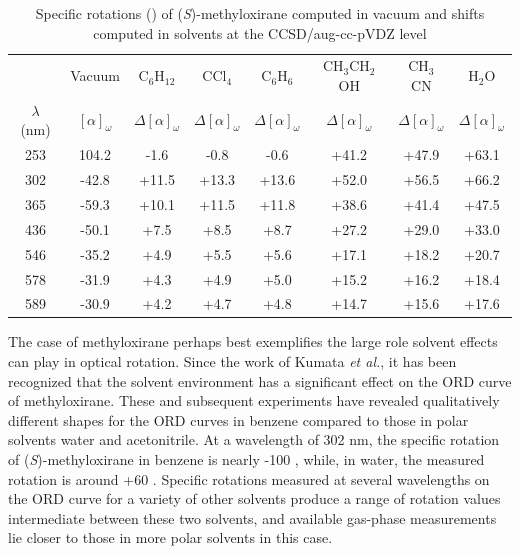 \begin{table}[h]
\caption{Specific rotations (\rotunits) of (\emph{S})-methyloxirane computed
in vacuum and shifts computed in solvents at the CCSD/aug-cc-pVDZ level
}
\begin{tabular*}{\linewidth}{@{\extracolsep{\fill}}cccccccc@{}}
  \hline \hline
&Vacuum &C$_6$H$_{12}$ &CCl$_4$&C$_6$H$_6$ &CH$_3$CH$_2$OH &CH$_3$CN  &H$_2$O \\
$\lambda$ (nm)
       &$[\alpha]_\omega$ &$\Delta [\alpha]_\omega$  &$\Delta [\alpha]_\omega$ 
&$\Delta [\alpha]_\omega$ &$\Delta [\alpha]_\omega$
&$\Delta [\alpha]_\omega$ &$\Delta [\alpha]_\omega$ \\
\hline
253 & 104.2 & -1.6  & -0.8 & -0.6 &+41.2 &+47.9 &+63.1 \\
302 & -42.8 &+11.5  &+13.3 &+13.6 &+52.0 &+56.5 &+66.2 \\
365 & -59.3 &+10.1  &+11.5 &+11.8 &+38.6 &+41.4 &+47.5 \\
436 & -50.1 & +7.5  & +8.5 & +8.7 &+27.2 &+29.0 &+33.0 \\
546 & -35.2 & +4.9  & +5.5 & +5.6 &+17.1 &+18.2 &+20.7 \\
578 & -31.9 & +4.3  & +4.9 & +5.0 &+15.2 &+16.2 &+18.4 \\
589 & -30.9 & +4.2  & +4.7 & +4.8 &+14.7 &+15.6 &+17.6 \\
\hline \hline
\end{tabular*}
\label{table:smo}
\end{table}

The case of methyloxirane perhaps best exemplifies the large role solvent
effects can play in optical rotation. Since the work of Kumata
\emph{et al.},\cite{Kumata:70} it has been recognized that the solvent
environment has a significant effect on the ORD curve of methyloxirane. 
These and subsequent experiments have revealed qualitatively different
shapes for the ORD curves in benzene compared to those in polar
solvents water and acetonitrile.\cite{Kumata:70,Wilson:05}
At a wavelength of 302 nm, the specific rotation of
(\emph{S})-methyloxirane in benzene is nearly -100 \rotunits, while, in water,
the measured rotation is around +60 \rotunits.\cite{Wilson:05} Specific rotations
measured at several wavelengths  on the ORD curve
for a variety of other solvents produce a range of
rotation values intermediate between these two solvents,
\cite{Kumata:70,Wilson:05} and available gas-phase measurements
lie closer to those in more polar solvents in this case.\cite{Wilson:05}

